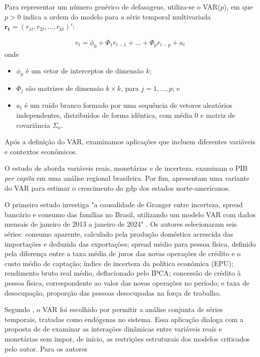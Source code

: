 Para representar um número genérico de defasagens, utiliza-se o VAR($p$), em que $p>0$ indica a ordem do modelo para a série temporal multivariada $\mathbf{r_t} = (r_{1t}, r_{2t},\ldots,r_{kt})'$:

\begin{align}
	\label{eq:VAR_p}
	r_t = \phi_0 + \varPhi_1 r_{t-1} +...+ \varPhi_p r_{t-p} + a_t
\end{align}
onde
\begin{itemize}
	\item[a)] $\phi_0$ é um vetor de interceptos de dimensão $k$;
	\item[b)] $\varPhi_j$ são matrizes de dimensão $k \times k$, para $j=1,\ldots,p$; e
	\item[c)] $a_t$ é um ruído branco formado por uma sequência de vetores aleatórios independentes, distribuídos de forma idêntica, com média 0 e matriz de covariância $\Sigma_a$.
\end{itemize}

Após a definição do VAR, examinamos aplicações que incluem diferentes variáveis e contextos econômicos.

O estudo de  aborda variáveis reais, monetárias e de incerteza.  examinam o PIB \textit{per capita} em uma análise regional brasileira.
Por fim,  apresentam uma variante do VAR para estimar o crescimento do \ac{gdp} dos estados norte-americanos.

O primeiro estudo investiga "a causalidade de Granger entre incerteza, spread bancário e consumo das famílias no Brasil, utilizando um modelo VAR com dados mensais de janeiro de 2013 a janeiro de 2024" . Os autores selecionaram seis séries: consumo aparente, calculado pela produção doméstica acrescida das importações e deduzida das exportações; spread médio para pessoa física, definido pela diferença entre a taxa média de juros das novas operações de crédito e o custo médio de captação; índice de incerteza da política econômica (EPU); rendimento bruto real médio, deflacionado pelo IPCA; concessão de crédito à pessoa física, correspondente ao valor das novas operações no período; e taxa de desocupação, proporção das pessoas desocupadas na força de trabalho.

Segundo , o VAR foi escolhido por permitir a análise conjunta de séries temporais, tratadas como endógenas no sistema. Essa aplicação dialoga com a proposta de  de examinar as interações dinâmicas entre variáveis reais e monetárias sem impor, de início, as restrições estruturais dos modelos criticados pelo autor.
Para os autores

